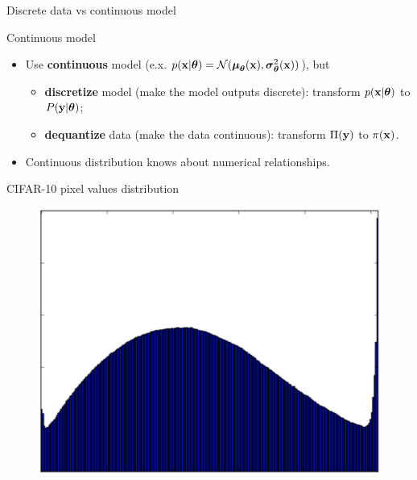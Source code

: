\begin{frame}{Discrete data vs continuous model}
	\begin{block}{Continuous model}
		\begin{itemize}
			\item Use \textbf{continuous} model (e.x. $p(\mathbf{x} | \boldsymbol{\theta}) = \mathcal{N}(\boldsymbol{\mu}_{\boldsymbol{\theta}}(\mathbf{x}), \boldsymbol{\sigma}_{\boldsymbol{\theta}}^2(\mathbf{x}))$), but
			\begin{itemize}
				\item \textbf{discretize} model (make the model outputs discrete): transform $p(\mathbf{x} | \boldsymbol{\theta})$ to $P(\mathbf{y} | \boldsymbol{\theta})$;
				\item \textbf{dequantize} data (make the data continuous): transform $\Pi(\mathbf{y})$ to $\pi(\mathbf{x})$.
			\end{itemize}
			\item Continuous distribution knows about numerical relationships.
		\end{itemize}
	\end{block}
	\begin{block}{CIFAR-10 pixel values distribution}
		\begin{figure}
			\includegraphics[width=0.6\linewidth,height=0.2\linewidth]{figs/CIFAR_pixel_distr}
		\end{figure}
	\end{block}
\end{frame}
